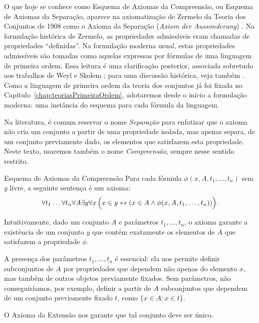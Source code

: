 O que hoje se conhece como Esquema de Axiomas da Compreensão, ou Esquema de Axiomas da Separação, aparece na axiomatização de Zermelo da Teoria dos Conjuntos de 1908 como o Axioma da Separação (\emph{Axiom der Aussonderung}) \cite[p.~263]{zermelo1908untersuchungen}.
Na formulação histórica de Zermelo, as propriedades admissíveis eram chamadas de propriedades ``definidas''.
Na formulação moderna usual, estas propriedades admissíveis são tomadas como aquelas expressas por fórmulas de uma linguagem de primeira ordem.
Essa leitura é uma clarificação posterior, associada sobretudo aos trabalhos de Weyl e Skolem
\cite{weyl1910definitionen,skolem1923bemerkungen}; para uma discussão histórica, veja também \cite{kanamori2004zermelo}.
Como a linguagem de primeira ordem da teoria dos conjuntos já foi fixada no Capítulo~\ref{chap:teoriasPrimeiraOrdem}, adotaremos desde o início a formulação moderna: uma instância do esquema para cada fórmula da linguagem.

Na literatura, é comum reservar o nome \emph{Separação} para enfatizar que o axioma não cria um conjunto a partir de uma propriedade isolada, mas apenas separa, de um conjunto previamente dado, os elementos que satisfazem esta propriedade.
Neste texto, usaremos também o nome \emph{Compreensão}, sempre nesse sentido restrito.

\begin{axiom}{Esquema de Axiomas da Compreensão}
    Para cada fórmula $\phi(x, A, t_1, \ldots, t_n)$ sem $y$ livre, a seguinte sentença é um axioma:
    \[
        \forall t_1 \ldots \forall t_n \forall A \exists y \forall x\, \Bigl(x \in y \leftrightarrow (x \in A \land \phi(x, A, t_1, \ldots, t_n))\Bigr).
    \]
\end{axiom}

Intuitivamente, dado um conjunto $A$ e parâmetros $t_1, \ldots, t_n$, o axioma garante a existência de um conjunto $y$ que contém exatamente os elementos de $A$ que satisfazem a propriedade $\phi$.

A presença dos parâmetros $t_1, \ldots, t_n$ é essencial: ela nos permite definir subconjuntos de $A$ por propriedades que dependem não apenas do elemento $x$, mas também de outros objetos previamente fixados.
Sem parâmetros, não conseguiríamos, por exemplo, definir a partir de $A$ subconjuntos que dependem de um conjunto previamente fixado $t$, como $\{x \in A : x \in t\}$.

O Axioma da Extensão nos garante que tal conjunto deve ser único.

